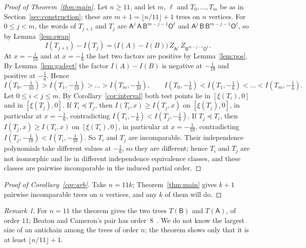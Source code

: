 \documentclass[11pt]{article}
\theoremstyle{definition}
\theoremstyle{remark}
\newtheorem{remark}{Remark}
\newcommand{\sA}{\mathsf A}
\newcommand{\sB}{\mathsf B}
\newcommand{\sO}{\mathsf O}
\begin{document}
\begin{proof}[Proof of Theorem~\ref{thm:main}]
Let $n\ge 11$, and let $m$, $\ell$ and $T_0,\dots,T_m$ be as in
Section~\ref{sec:construction}; these are $m+1=\lfloor n/11\rfloor+1$ trees on
$n$ vertices. For $0\le j<m$, the words of $T_{j+1}$ and $T_j$ are
$\sA^{j}\,\sA\,\sB^{m-j-1}\sO^{\ell}$ and $\sA^{j}\,\sB\,\sB^{m-j-1}\sO^{\ell}$,
so by Lemma~\ref{lem:swap}
\[
I(T_{j+1})-I(T_j)=\bigl(I(A)-I(B)\bigr)\,Z_{\sA^j}\,Z_{\sB^{m-j-1}\sO^\ell}.
\]
At $x=-\frac1{10}$ and at $x=-\frac16$ the last two factors are positive by
Lemma~\ref{lem:pos}. By Lemma~\ref{lem:gadget} the factor $I(A)-I(B)$ is negative at
$-\frac1{10}$ and positive at $-\frac16$. Hence
\[
I(T_0,-\tfrac1{10})>I(T_1,-\tfrac1{10})>\dots>I(T_m,-\tfrac1{10}),\qquad
I(T_0,-\tfrac16)<I(T_1,-\tfrac16)<\dots<I(T_m,-\tfrac16).
\]
Let $0\le i<j\le m$. By Corollary~\ref{cor:interval} both test points lie in
$[\xi(T_i),0]$ and in $[\xi(T_j),0]$. If $T_i\preceq T_j$, then
$I(T_i,x)\ge I(T_j,x)$ on $[\xi(T_j),0]$, in particular at $x=-\frac16$,
contradicting $I(T_i,-\frac16)<I(T_j,-\frac16)$. If $T_j\preceq T_i$, then
$I(T_j,x)\ge I(T_i,x)$ on $[\xi(T_i),0]$, in particular at $x=-\frac1{10}$,
contradicting $I(T_j,-\frac1{10})<I(T_i,-\frac1{10})$. So $T_i$ and $T_j$ are
incomparable. Their independence polynomials take different values at
$-\frac16$, so they are different; hence $T_i$ and $T_j$ are not isomorphic and
lie in different independence equivalence classes, and these classes are
pairwise incomparable in the induced partial order.
\end{proof}

\begin{proof}[Proof of Corollary~\ref{cor:arb}]
Take $n=11k$; Theorem~\ref{thm:main} gives $k+1$ pairwise incomparable trees
on $n$ vertices, and any $k$ of them will do.
\end{proof}

\begin{remark}
For $n=11$ the theorem gives the two trees $T(\sB)$ and $T(\sA)$, of order
$11$; Beaton and Cameron's pair has order~$8$~\cite[Figure~16]{bc}. We do
not know the largest size of an antichain among the trees of order $n$; the
theorem shows only that it is at least $\lfloor n/11\rfloor+1$.
\end{remark}
\end{document}
